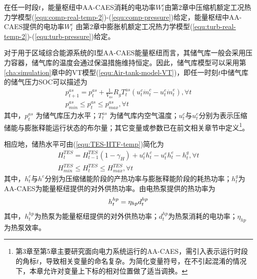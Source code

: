 

在任一时段$t$，能量枢纽中AA-CAES消耗的电功率$W_t^c$由第2章中压缩机额定工况热力学模型(\ref{equ:comp-real-temp-2})-(\ref{equ:comp-pressure})给定，能量枢纽中AA-CAES提供的电功率$W_t^e$ 由第2章中膨胀机额定工况热力学模型(\ref{equ:turb-real-temp-2})-(\ref{equ:turb-pressure})给定。

对于用于区域综合能源系统的I型AA-CAES能量枢纽而言，其储气库一般会采用压力容器，储气库的温度会通过保温措施维持恒定。因此，储气库模型可以采用第\ref{cha:simulation}章中的VT模型(\ref{equ:Air-tank-model-VT})，即任一时刻$t$中储气库的储气压力SOC可以描述为
\begin{subequations}
\label{eq:hub-pressure-SOC}
\begin{gather}
p_{t + 1}^{as} = p_{t}^{as} + \frac{1}{V_{as}}{R_g}T_t^{as}\left( {u_{t}^c \dot m_{t}^c - u_{t}^e \dot m_{t}^e} \right),\forall t\\
p_{min}^{as} \le p_{t}^{as} \le p_{max}^{as},\forall t
\end{gather}
\end{subequations}
其中，$p_{t}^{as}$ 为储气库压力水平；$T_t^{as}$ 为储气库内空气温度；$u_t^c$与$u_t^e$分别为表示压缩储能与膨胀释能运行状态的布尔量；其它变量或参数已在前文相关章节中定义\footnote{第3章至第5章主要研究面向电力系统运行的AA-CAES，需引入表示运行时段的角标$t$，导致相关变量的命名复杂。为简化变量符号，在不引起混淆的情况下，本章允许对变量上下标的相对位置做了适当调换。}。

相应地，储热水平可由(\ref{equ:TES-HTF-temp})简化为
\begin{subequations}
\label{eq:hub-thermal-SOC}
\begin{gather}
H_{t}^{TES} = H_{t - 1}^{TES}(1-\gamma_H) + u_{t}^c h_{t}^c - u_{t}^e h_{t}^e - h_{t}^g,\forall t \label{eq:hub-thermal-SOC-Eq}\\
H_{min}^{TES} \le H_{t}^{TES} \le H_{max}^{TES},\forall t
\end{gather}
\end{subequations}
其中，$h_t^c$与$h^e$分别为压缩储能阶段的产热功率与膨胀释能阶段的耗热功率；$h_t^g$为AA-CAES为能量枢纽提供的对外供热功率。由电热泵提供的热功率为
\begin{equation}
\label{equ:model-HP}
h_{t}^{hp} = \eta_{hp}d_{t}^{hp} \\
\end{equation}
其中，$h_{t}^{hp}$为热泵为能量枢纽提供的对外供热功率；$d_{t}^{hp}$为热泵消耗的电功率；$\eta_{hp}$为热泵效率。

